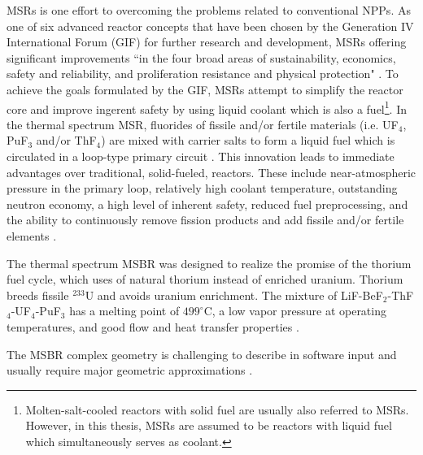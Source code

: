 \glspl{MSR} is one effort to overcoming the problems related to conventional \glspl{NPP}. As one of six advanced reactor concepts that have been chosen by the Generation IV International Forum (GIF) for further research and development, \glspl{MSR}  offering significant improvements ``in the four broad areas of sustainability, economics, safety and reliability, and proliferation resistance and physical protection" \cite{doe_technology_2002}. To achieve the goals formulated by the GIF, \glspl{MSR} attempt to simplify the reactor core and improve ingerent safety by using liquid coolant which is also a fuel\footnote{Molten-salt-cooled reactors with solid fuel are usually also referred to \glspl{MSR}. However, in this thesis, \glspl{MSR} are assumed to be reactors with liquid fuel which simultaneously serves as coolant.}. In the thermal spectrum \gls{MSR}, fluorides of fissile and/or fertile materials (i.e. UF$_4$, PuF$_3$ and/or ThF$_4$) are mixed with carrier salts to form a liquid fuel which is circulated in a loop-type primary circuit \cite{haubenreich_experience_1970}. This innovation leads to immediate advantages over traditional, solid-fueled, reactors. These include near-atmospheric pressure in the primary loop, relatively high coolant temperature, outstanding neutron economy, a high level of inherent safety, reduced fuel preprocessing, and the ability to continuously remove fission products and add fissile and/or fertile elements \cite{leblanc_molten_2010}. 

The thermal spectrum \gls{MSBR} was designed to realize the promise of the thorium fuel cycle, which uses of natural thorium instead of enriched uranium. Thorium breeds fissile $^{233}$U and avoids uranium enrichment. The mixture of LiF-BeF$_2$-ThF$_4$-UF$_4$-PuF$_3$ has a melting point of $499^\circ$C, a low vapor pressure at operating temperatures, and good flow and heat transfer properties \cite{robertson_conceptual_1971}. 

The \gls{MSBR} complex geometry is challenging to describe in software input and usually require major geometric 
approximations \cite{park_whole_2015}. 

